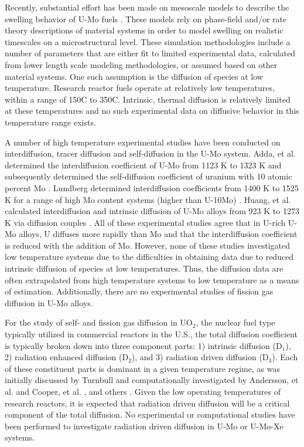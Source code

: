 \documentclass[default]{sn-jnl}%
\begin{document}
Recently, substantial effort has been made on mesoscale models to describe the swelling behavior of U-Mo fuels \cite{liang2018, liang2018a, liang2017, liang2016, ye2018, hu2017a, hu2016, hu2016a}. These models rely on phase-field and/or rate theory descriptions of material systems in order to model swelling on realistic timescales on a microstructural level. These simulation methodologies include a number of parameters that are either fit to limited experimental data, calculated from lower length scale modeling methodologies, or assumed based on other material systems. One such assumption is the diffusion of species at low temperature. Research reactor fuels operate at relatively low temperatures, within a range of 150\textdegree C to 350\textdegree C. Intrinsic, thermal diffusion is relatively limited at these temperatures and no such experimental data on diffusive behavior in this temperature range exists. 

A number of high temperature experimental studies have been conducted on interdiffusion, tracer diffusion and self-diffusion in the U-Mo system. Adda, et al. determined the interdiffusion coefficient of U-Mo from 1123 K to 1323 K and subsequently determined the self-diffusion coefficient of uranium with 10 atomic percent Mo \cite{adda1962}. Lundberg determined interdiffusion coefficients from 1400 K to 1525 K for a range of high Mo content systems (higher than U-10Mo) \cite{lundberg1989}. Huang, et al. calculated interdiffusion and intrinsic diffusion of U-Mo alloys from 923 K to 1273 K via diffusion couples \cite{huang2013}. All of these experimental studies agree that in U-rich U-Mo alloys, U diffuses more rapidly than Mo and that the interdiffusion coefficient is reduced with the addition of Mo. However, none of these studies investigated low temperature systems due to the difficulties in obtaining data due to reduced intrinsic diffusion of species at low temperatures. Thus, the diffusion data are often extrapolated from high temperature systems to low temperature as a means of estimation. Additionally, there are no experimental studies of fission gas diffusion in U-Mo alloys. 

For the study of self- and fission gas diffusion in UO$_2$, the nuclear fuel type typically utilized in commercial reactors in the U.S., the total diffusion coefficient is typically broken down into three component parts: 1) intrinsic diffusion (D$_1$), 2) radiation enhanced diffusion (D$_2$), and 3) radiation driven diffusion (D$_3$). Each of these constituent parts is dominant in a given temperature regime, as was initially discussed by Turnbull \cite{turnbull1982} and computationally investigated by Andersson, et al. \cite{andersson2014} and Cooper, et al. \cite{cooper2016}, and others \cite{matthews_cluster_2019, perriot_atomistic_2019, wormald2015, martin2009}. Given the low operating temperatures of research reactors, it is expected that radiation driven diffusion will be a critical component of the total diffusion. No experimental or computational studies have been performed to investigate radiation driven diffusion in U-Mo or U-Mo-Xe systems.
\end{document}
